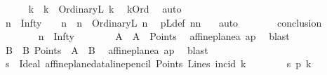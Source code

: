 \begin{isabellebody}
\ \ \ \ \isamarkupfalse%
\ k{}\ \ {\isachardoublequoteopen}k\ {\isacharequal}{\kern0pt}\ OrdinaryL\ k{}{\isachardoublequoteclose}\ \isamarkupfalse%
\ kOrd\ \isamarkupfalse%
\ auto\isanewline
\ \ \ \ \isamarkupfalse%
\ {\isachardoublequoteopen}{\isacharparenleft}{\kern0pt}n\ {\isacharequal}{\kern0pt}\ Infty{\isacharparenright}{\kern0pt}\ {\isacharbar}{\kern0pt}\ \ {\isacharparenleft}{\kern0pt}{\isasymexists}\ n{}\ {\isachardot}{\kern0pt}\ n\ {\isacharequal}{\kern0pt}\ OrdinaryL\ n{}{\isacharparenright}{\kern0pt}{\isachardoublequoteclose}\ \isamarkupfalse%
\ pLdef\ nn\ \ \isamarkupfalse%
\ auto\isanewline
\ \ \ \ \isamarkupfalse%
\ \isamarkupfalse%
\ {\isacharquery}{\kern0pt}conclusion\isanewline
\ \ \ \ \isamarkupfalse%
\isanewline
\ \ \ \ \ \ \isamarkupfalse%
\ {\isachardoublequoteopen}n\ {\isacharequal}{\kern0pt}\ Infty{\isachardoublequoteclose}\isanewline
\ \ \ \ \ \ \isamarkupfalse%
\ {\isachardoublequoteopen}A{\isachardoublequoteclose}\ \ {\isachardoublequoteopen}A\ {\isasymin}\ Points{\isachardoublequoteclose}\ \isamarkupfalse%
\ affine{\isacharunderscore}{\kern0pt}plane{\isachardot}{\kern0pt}a{}\ ap\ \isamarkupfalse%
\ blast\isanewline
\ \ \ \ \ \ \isamarkupfalse%
\ {\isachardoublequoteopen}B{\isachardoublequoteclose}\ \ {\isachardoublequoteopen}B{\isasymin}\ Points\ {\isasymand}\ A\ {\isasymnoteq}\ B{\isachardoublequoteclose}\ \isamarkupfalse%
\ affine{\isacharunderscore}{\kern0pt}plane{\isachardot}{\kern0pt}a{}\ ap\ \isamarkupfalse%
\ blast\isanewline
\ \ \ \ \ \ \isamarkupfalse%
\ {\isacharquery}{\kern0pt}s\ {\isacharequal}{\kern0pt}\ {\isachardoublequoteopen}Ideal\ {\isacharparenleft}{\kern0pt}affine{\isacharunderscore}{\kern0pt}plane{\isacharunderscore}{\kern0pt}data{\isachardot}{\kern0pt}line{\isacharunderscore}{\kern0pt}pencil\ Points\ Lines\ {\isacharparenleft}{\kern0pt}incid{\isacharparenright}{\kern0pt}\ k{}{\isacharparenright}{\kern0pt}{\isachardoublequoteclose}\isanewline
\ \ \ \ \ \ \isamarkupfalse%
\ {\isachardoublequoteopen}{\isacharquery}{\kern0pt}s\ p{\isasymlhd}\ k{\isachardoublequoteclose}\isanewline
\ \ \ \ \ \ \ \ \isamarkupfalse%

\end{isabellebody}
